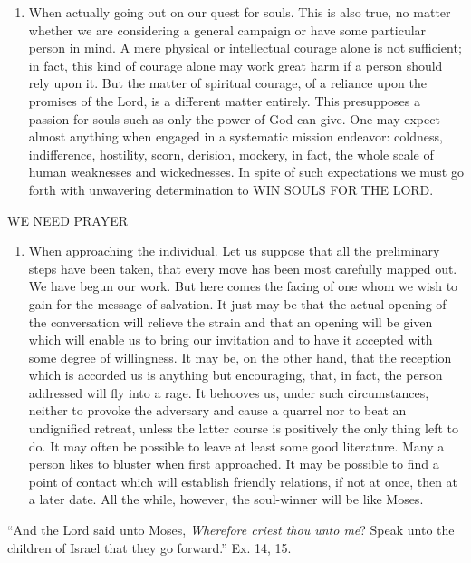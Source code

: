 \documentclass[
]{book}
\providecommand{\tightlist}{%
  \setlength{\itemsep}{0pt}\setlength{\parskip}{0pt}}
\begin{document}
\begin{enumerate}
\def\labelenumi{\alph{enumi}.}
\setcounter{enumi}{2}
\tightlist
\item
  When actually going out on our quest for souls. This is also true, no matter whether we are considering a general campaign or have some particular person in mind. A mere physical or intellectual courage alone is not sufficient; in fact, this kind of courage alone may work great harm if a person should rely upon it. But the matter of spiritual courage, of a reliance upon the promises of the Lord, is a different matter entirely. This presupposes a passion for souls such as only the power of God can give. One may expect almost anything when engaged in a systematic mission endeavor: coldness, indifference, hostility, scorn, derision, mockery, in fact, the whole scale of human weaknesses and wickednesses. In spite of such expectations we must go forth with unwavering determination to WIN SOULS FOR THE LORD.
\end{enumerate}

WE NEED PRAYER

\begin{enumerate}
\def\labelenumi{\alph{enumi}.}
\setcounter{enumi}{3}
\tightlist
\item
  When approaching the individual. Let us suppose that all the preliminary steps have been taken, that every move has been most carefully mapped out. We have begun our work. But here comes the facing of one whom we wish to gain for the message of salvation. It just may be that the actual opening of the conversation will relieve the strain and that an opening will be given which will enable us to bring our invitation and to have it accepted with some degree of willingness. It may be, on the other hand, that the reception which is accorded us is anything but encouraging, that, in fact, the person addressed will fly into a rage. It behooves us, under such circumstances, neither to provoke the adversary and cause a quarrel nor to beat an undignified retreat, unless the latter course is positively the only thing left to do. It may often be possible to leave at least some good literature. Many a person likes to bluster when first approached. It may be possible to find a point of contact which will establish friendly relations, if not at once, then at a later date. All the while, however, the soul-winner will be like Moses.
\end{enumerate}

``And the Lord said unto Moses, \emph{Wherefore criest thou unto me}? Speak unto the children of Israel that they go forward.'' Ex. 14, 15.
\end{document}
